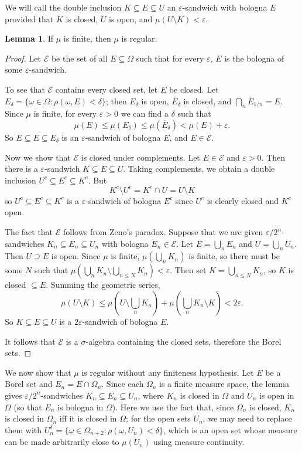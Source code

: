 \documentclass[10pt]{article}
\theoremstyle{definition}
\newtheorem{lemma}{Lemma}[exer]
\begin{document}
We will call the double inclusion $K \subseteq E \subseteq U$ an $\varepsilon$-sandwich with bologna $E$ provided that $K$ is closed, $U$ is open, and $\mu(U \setminus K) < \varepsilon$.
\begin{lemma}
If $\mu$ is finite, then $\mu$ is regular.
\end{lemma}
\begin{proof}
Let $\mathcal E$ be the set of all $E \subseteq \Omega$ such that for every $\varepsilon$, $E$ is the bologna of some $\varepsilon$-sandwich.

To see that $\mathcal E$ contains every closed set, let $E$ be closed.
Let $E_\delta = \{\omega \in \Omega: \rho(\omega, E) < \delta\}$; then $E_\delta$ is open, $\overline E_\delta$ is closed, and $\bigcap_n \overline E_{1/n} = E$.
Since $\mu$ is finite, for every $\varepsilon > 0$ we can find a $\delta$ such that
$$\mu(E) \leq \mu(E_\delta) \leq \mu(\overline E_\delta) < \mu(E) + \varepsilon.$$
So $E \subseteq E \subseteq E_\delta$ is an $\varepsilon$-sandwich of bologna $E$, and $E \in \mathcal E$.

Now we show that $\mathcal E$ is closed under complements.
Let $E \in \mathcal E$ and $\varepsilon > 0$.
Then there is a $\varepsilon$-sandwich $K \subseteq E \subseteq U$.
Taking complements, we obtain a double inclusion $U^c \subseteq E^c \subseteq K^c$.
But
$$K^c \setminus U^c = K^c \cap U = U \setminus K$$
so $U^c \subseteq E^c \subseteq K^c$ is a $\varepsilon$-sandwich of bologna $E^c$ since $U^c$ is clearly closed and $K^c$ open.

The fact that $\mathcal E$ follows from Zeno's paradox. Suppose that we are given $\varepsilon/2^n$-sandwiches $K_n \subseteq E_n \subseteq U_n$ with bologna $E_n \in \mathcal E$.
Let $E = \bigcup_n E_n$ and $U = \bigcup_n U_n$. Then $U \supseteq E$ is open.
Since $\mu$ is finite, $\mu(\bigcup_n K_n)$ is finite, so there must be some $N$ such that $\mu(\bigcup_n K_n \setminus \bigcup_{n \leq N} K_n) < \varepsilon$. Then set $K = \bigcup_{n \leq N} K_n$, so $K$ is closed $\subseteq E$.
Summing the geometric series,
$$\mu(U \setminus K) \leq \mu\left(U \setminus \bigcup_n K_n\right) + \mu\left(\bigcup_n K_n \setminus K\right) < 2\varepsilon.$$
So $K \subseteq E \subseteq U$ is a $2\varepsilon$-sandwich of bologna $E$.

It follows that $\mathcal E$ is a $\sigma$-algebra containing the closed sets, therefore the Borel sets.
\end{proof}

We now show that $\mu$ is regular without any finiteness hypothesis.
Let $E$ be a Borel set and $E_n = E \cap \Omega_n$.
Since each $\Omega_n$ is a finite measure space, the lemma gives $\varepsilon/2^n$-sandwiches $K_n \subseteq E_n \subseteq U_n$, where $K_n$ is closed in $\Omega$ and $U_n$ is open in $\Omega$ (so that $E_n$ is bologna in $\Omega$).
Here we use the fact that, since $\Omega_n$ is closed, $K_n$ is closed in $\Omega_n$ iff it is closed in $\Omega$; for the open sets $U_n$, we may need to replace them with $U_n^\delta = \{\omega \in \Omega_{n+2}: \rho(\omega, U_n) < \delta\}$, which is an open set whose measure can be made arbitrarily close to $\mu(U_n)$ using measure continuity.
\end{document}

